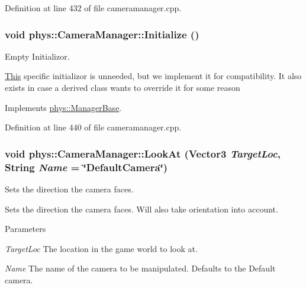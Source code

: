 Definition at line 432 of file cameramanager.cpp.

\hypertarget{classphys_1_1CameraManager_a5e956b61fa341ae576d8d160da518488}{
\subsubsection[{Initialize}]{\setlength{\rightskip}{0pt plus 5cm}void phys::CameraManager::Initialize ()}}
\label{d9/d91/classphys_1_1CameraManager_a5e956b61fa341ae576d8d160da518488}


Empty Initializor. 

\hyperlink{structThis}{This} specific initializor is unneeded, but we implement it for compatibility. It also exists in case a derived class wants to override it for some reason 

Implements \hyperlink{classphys_1_1ManagerBase_a57dd8e54e767427d5bdcc86dc66d73ed}{phys::ManagerBase}.



Definition at line 440 of file cameramanager.cpp.

\hypertarget{classphys_1_1CameraManager_a885a499a53c3543b6bf429583a2cb54c}{
\subsubsection[{LookAt}]{\setlength{\rightskip}{0pt plus 5cm}void phys::CameraManager::LookAt ({\bf Vector3} {\em TargetLoc}, \/  {\bf String} {\em Name} = {\ttfamily \char`\"{}DefaultCamera\char`\"{}})}}
\label{d9/d91/classphys_1_1CameraManager_a885a499a53c3543b6bf429583a2cb54c}


Sets the direction the camera faces. 

Sets the direction the camera faces. Will also take orientation into account. 
\begin{DoxyParams}{Parameters}
\item[{\em TargetLoc}]The location in the game world to look at. \item[{\em Name}]The name of the camera to be manipulated. Defaults to the Default camera. \end{DoxyParams}


